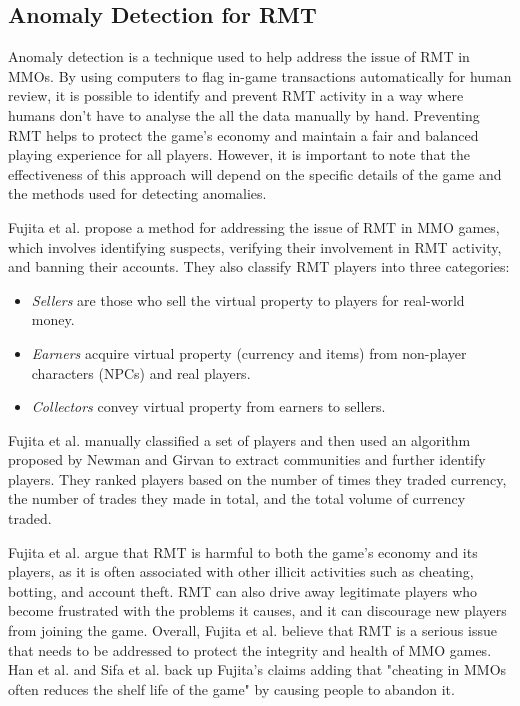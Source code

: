 \documentclass[journal]{IEEEtran}
\begin{document}
\subsection{Anomaly Detection for RMT}
\noindent Anomaly detection is a technique used to help address the issue of RMT in MMOs\cite{Tao2019}\cite{Ahmad2009}. By using computers to flag in-game transactions automatically for human review, it is possible to identify and prevent RMT activity in a way where humans don't have to analyse the all the data manually by hand. Preventing RMT helps to protect the game's economy and maintain a fair and balanced playing experience for all players. However, it is important to note that the effectiveness of this approach will depend on the specific details of the game and the methods used for detecting anomalies.

Fujita et al. propose a method for addressing the issue of RMT in MMO games, which involves identifying suspects, verifying their involvement in RMT activity, and banning their accounts\cite{Fujita2011}. They also classify RMT players into three categories: 
\begin{itemize}
    \item \textit{Sellers} are those who sell the virtual property to players for real-world money.
    \item \textit{Earners} acquire virtual property (currency and items) from non-player characters (NPCs) and real players.
    \item \textit{Collectors} convey virtual property from earners to sellers.
\end{itemize}

Fujita et al. manually classified a set of players and then used an algorithm proposed by Newman and Girvan\cite{Girvan2002} to extract communities and further identify players. They ranked players based on the number of times they traded currency, the number of trades they made in total, and the total volume of currency traded.

Fujita et al. argue that RMT is harmful to both the game's economy and its players, as it is often associated with other illicit activities such as cheating, botting, and account theft. RMT can also drive away legitimate players who become frustrated with the problems it causes, and it can discourage new players from joining the game\cite{Sifa2021}. Overall, Fujita et al. believe that RMT is a serious issue that needs to be addressed to protect the integrity and health of MMO games. Han et al. and Sifa et al. back up Fujita's claims adding that "cheating in MMOs often reduces the shelf life of the game" by causing people to abandon it\cite{Han2022}\cite{Sifa2021}.
\end{document}
